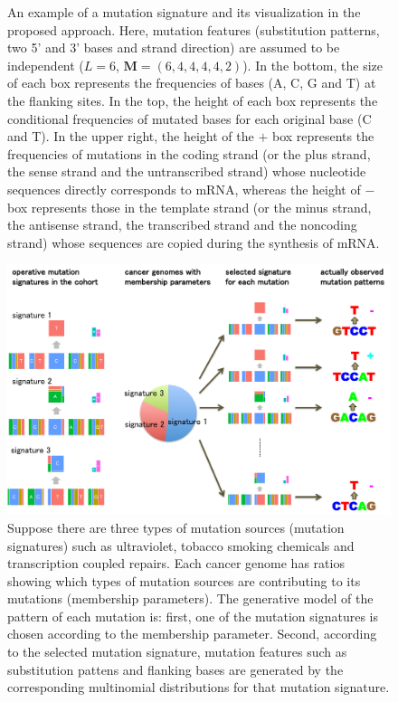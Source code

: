 \begin{figure}
\begin{minipage}{0.4\textwidth}
\begin{flushleft}
\end{flushleft}
\end{minipage}
\caption{An example of a mutation signature and its visualization in the proposed approach.
Here, mutation features (substitution patterns, two 5' and 3' bases and strand direction) 
are assumed to be independent ($L=6$, $\bm{M} = (6, 4, 4, 4, 4, 2)$).
In the bottom, the size of each box represents the frequencies of bases (A, C, G and T) at the flanking sites.
In the top, the height of each box represents the conditional frequencies of mutated bases for each original base (C and T).
In the upper right, the height of the $+$ box represents the frequencies of mutations in the coding strand (or the plus strand, the sense strand and the untranscribed strand)
whose nucleotide sequences directly corresponds to mRNA, 
whereas the height of $-$ box represents those in the template strand (or the minus strand, the antisense strand, the transcribed strand and the noncoding strand)
whose sequences are copied during the synthesis of mRNA.
}
\label{mutSig_example}

\end{figure}


\clearpage


\begin{figure}
\includegraphics[width=450pt]{methodOverview.pdf}
\caption{Suppose there are three types of mutation sources (mutation signatures) such as ultraviolet, tobacco smoking chemicals and transcription coupled repairs.
Each cancer genome has ratios showing which types of mutation sources are contributing to its mutations (membership parameters).
The generative model of the pattern of each mutation is:
first, one of the mutation signatures is chosen according to the membership parameter.
Second, according to the selected mutation signature, mutation features such as substitution pattens and flanking bases are generated 
by the corresponding multinomial distributions for that mutation signature.
}
\label{methodOverview}
\end{figure}



